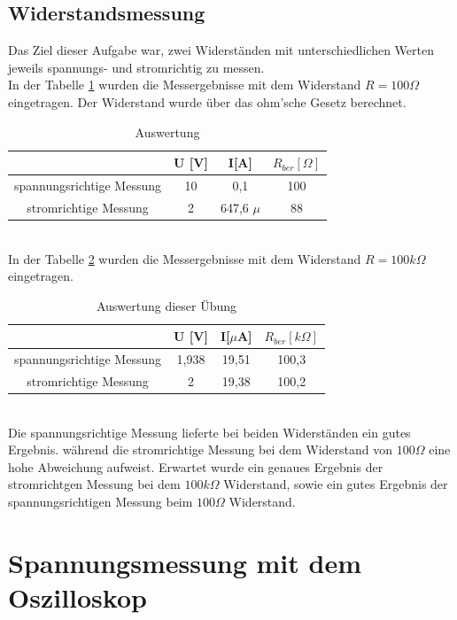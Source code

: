 \subsection{Widerstandsmessung}
Das Ziel dieser Aufgabe war, zwei Widerständen mit unterschiedlichen Werten jeweils spannungs- und stromrichtig zu messen.\\
In der Tabelle \ref{tb:r_100} wurden die Messergebnisse mit dem Widerstand $R=100 \Omega$ eingetragen. Der Widerstand wurde über das ohm'sche Gesetz berechnet. \\
\begin{table}[h]
	\centering
	\begin{tabular}{|c|c|c|c|}
	\hline 
						& U [V]	& I[A]			& $R_{ber} [\Omega]$		\\ 
	\hline 
	spannungsrichtige Messung	& 10		& 0,1			& 100		\\ 
	\hline 
	stromrichtige Messung		& 2		& 647,6 $\mu$	& 88		\\ 
	\hline 
	\end{tabular}
	\caption{Auswertung }
	\label{tb:r_100}
\end{table}
~\\
In der Tabelle \ref{tb:r_100k} wurden die Messergebnisse mit dem Widerstand $R=100 k\Omega$ eingetragen.\\
\begin{table}[h]
	\centering
	\begin{tabular}{|c|c|c|c|}
	\hline 
						& U [V]	& I[$\mu$A]		& $R_{ber} [k\Omega]$		\\ 
	\hline 
	spannungsrichtige Messung	& 1,938	& 19,51		& 100,3		\\ 
	\hline 
	stromrichtige Messung		& 2		& 19,38		& 100,2		\\ 
	\hline 
	\end{tabular}
	\caption{Auswertung dieser Übung}
	\label{tb:r_100k}
\end{table}
~\\
Die spannungsrichtige Messung lieferte bei beiden Widerständen ein gutes Ergebnis. während die stromrichtige Messung bei dem Widerstand von $100 \Omega$ eine hohe Abweichung aufweist. Erwartet wurde ein genaues Ergebnis
der stromrichtgen Messung bei dem $100 k\Omega$ Widerstand, sowie ein gutes Ergebnis
der spannungsrichtigen Messung beim $100 \Omega$ Widerstand.

\section{Spannungsmessung mit dem Oszilloskop}
